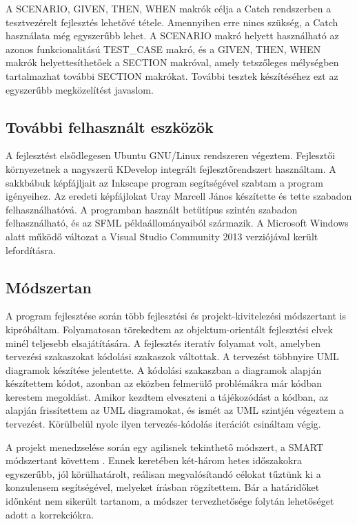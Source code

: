 \documentclass[12pt, twoside]{report}
\begin{document}
A SCENARIO, GIVEN, THEN, WHEN makrók célja a Catch rendszerben a tesztvezérelt fejlesztés lehetővé tétele. Amennyiben erre nincs szükség, a Catch használata még egyszerűbb lehet. A SCENARIO makró helyett használható az azonos funkcionalitású TEST\_CASE makró, és a GIVEN, THEN, WHEN makrók helyettesíthetőek a SECTION makróval, amely tetszőleges mélységben tartalmazhat további SECTION makrókat. További tesztek készítéséhez ezt az egyszerűbb megközelítést javaslom.

\subsection{További felhasznált eszközök}

A fejlesztést elsődlegesen Ubuntu GNU/Linux rendszeren végeztem. Fejlesztői környezetnek a nagyszerű KDevelop integrált fejlesztőrendszert használtam. A sakkbábuk képfájljait az Inkscape program segítségével szabtam a program igényeihez. Az eredeti képfájlokat Uray Marcell János készítette és tette szabadon felhasználhatóvá. A programban használt betűtípus szintén szabadon felhasználható, és az SFML példaállományaiból származik. A Microsoft Windows alatt működő változat a Visual Studio Community 2013 verziójával került lefordításra.

\subsection{Módszertan}

A program fejlesztése során több fejlesztési és projekt-kivitelezési módszertant is kipróbáltam. Folyamatosan törekedtem az objektum-orientált fejlesztési elvek minél teljesebb elsajátítására. A fejlesztés iteratív folyamat volt, amelyben tervezési szakaszokat kódolási szakaszok váltottak. A tervezést többnyire UML diagramok készítése jelentette. A kódolási szakaszban a diagramok alapján készítettem kódot, azonban az eközben felmerülő problémákra már kódban kerestem megoldást. Amikor kezdtem elveszteni a tájékozódást a kódban, az alapján frissítettem az UML diagramokat, és ismét az UML szintjén végeztem a tervezést. Körülbelül nyolc ilyen tervezés-kódolás iterációt csináltam végig.

A projekt menedzselése során egy agilisnek tekinthető módszert, a SMART módszertant követtem \cite{smart}. Ennek keretében két-három hetes időszakokra egyszerűbb, jól körülhatárolt, reálisan megvalósítandó célokat tűztünk ki a konzulensem segítségével, melyeket írásban rögzítettem. Bár a határidőket időnként nem sikerült tartanom, a módszer tervezhetősége folytán lehetőséget adott a korrekciókra.
\end{document}
